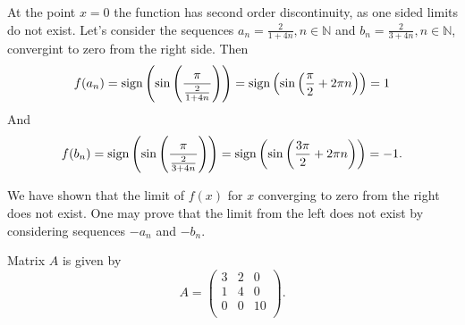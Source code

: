 \documentclass[addpoints, answers]{exam} %
\begin{document}
\begin{questions}
\begin{solution}
At the point $x=0$ the function has second order discontinuity, as one sided limits do not exist. Let's consider the sequences $a_n = \frac{2}{1+4 n}, n
\in \mathbb{N}$ and $b_n = \frac{2}{3+4 n}, n \in \mathbb{N}$, convergint to zero from the right side. Then
\[
f(a_n) = {\operatorname{sign}} \left(\sin \left( \frac{\pi}{\frac{2}{1+4 n}}\right)\right) = {\operatorname{sign}} \left( \sin \left( \frac{\pi}{2} + 2 \pi n \right)\right)=1
\]
And
\[
f(b_n) = {\operatorname{sign}} \left(\sin \left( \frac{\pi}{\frac{2}{3+4 n}}\right)\right) = {\operatorname{sign}} \left( \sin \left( \frac{3 \pi}{2} + 2 \pi n \right)\right)=-1.
\]

We have shown that the limit of $f(x)$ for $x$ converging to zero from the right does not exist. One may prove that the limit from the left does not exist by considering sequences $-a_n$ and $-b_n$.
\end{solution}





\question Matrix $A$ is given by
\[
A=\begin{pmatrix}
3 & 2 & 0 \\
1 & 4 & 0 \\
0 & 0 & 10 \\
\end{pmatrix}.
\]

\end{questions}
\end{document}
